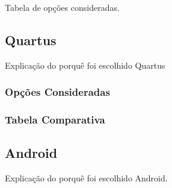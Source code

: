 	Tabela de opções consideradas.
	
	\subsection{Quartus}\label{soft-quartus}
	
	Explicação do porquê foi escolhido Quartus
	
	\subsubsection{Opções Consideradas}\label{quartus-options}
	
	\lipsum[10]
	
	\subsubsection{Tabela Comparativa}\label{quartus-table}
	
	\lipsum[11]
	
	\subsection{Android}\label{soft-android}
	
	Explicação do porquê foi escolhido Android.
